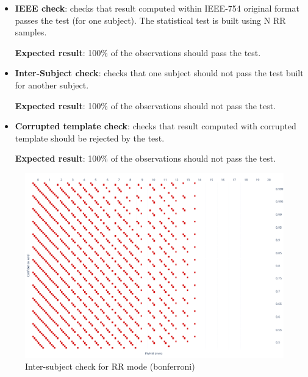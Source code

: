 \documentclass{article}
\begin{document}
\begin{itemize}
    \item \textbf{IEEE check}: checks that result computed within IEEE-754 original
          format passes the test (for one subject). The statistical test is built using N
          RR samples.

          \textbf{Expected result}: 100\% of the observations should pass the test.
    \item \textbf{Inter-Subject check}: checks that one subject should not pass the
          test built for another subject.

          \textbf{Expected result}: 100\% of the observations should not pass the test.

    \item \textbf{Corrupted template check}: checks that result computed with
          corrupted template should be rejected by the test.

          \textbf{Expected result}: 100\% of the observations should not pass the test.
\end{itemize}




\begin{figure}
    \centering
    \includegraphics[width=\linewidth]{figures/inter-subject/one_mct_fwe_bonferroni__RR.pdf}
    \caption{Inter-subject check for RR mode (bonferroni)}
\end{figure}
\end{document}
